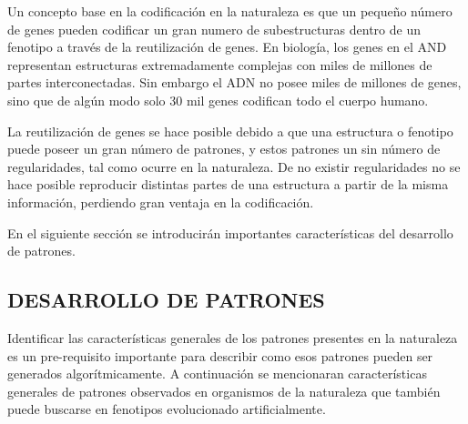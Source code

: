 Un concepto base en la codificación en la naturaleza es que un pequeño número de genes pueden codificar un gran numero de subestructuras dentro de un fenotipo a través de la reutilización de genes. En biología, los genes en el AND representan estructuras extremadamente complejas con miles de millones de partes interconectadas. Sin embargo el ADN no posee miles de millones de genes, sino que de algún modo solo 30 mil genes codifican todo el cuerpo humano.

La reutilización de genes se hace posible debido a que una estructura o fenotipo puede poseer un gran número de patrones, y estos patrones un sin número de regularidades, tal como ocurre en la naturaleza. De no existir regularidades no se hace posible reproducir distintas partes de una estructura a partir de la misma información, perdiendo gran ventaja en la codificación. 

En el siguiente sección se introducirán importantes características del desarrollo de patrones.

\subsection{DESARROLLO DE PATRONES}

Identificar las características generales de los patrones presentes en la naturaleza es un pre-requisito importante para describir como esos patrones pueden ser generados algorítmicamente. A continuación se mencionaran características generales de patrones observados en organismos de la naturaleza que también puede buscarse en fenotipos evolucionado artificialmente.

